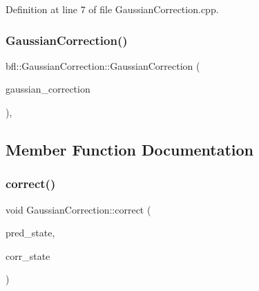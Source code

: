Definition at line 7 of file Gaussian\+Correction.\+cpp.

\mbox{\label{classbfl_1_1GaussianCorrection_af901442309ecdc64607ab256aabc78a7}} 
\subsubsection{\texorpdfstring{Gaussian\+Correction()}{GaussianCorrection()}\hspace{0.1cm}{\footnotesize\ttfamily [2/2]}}
{\footnotesize\ttfamily bfl\+::\+Gaussian\+Correction\+::\+Gaussian\+Correction (\begin{DoxyParamCaption}\item[{\mbox{\hyperlink{classbfl_1_1GaussianCorrection}{Gaussian\+Correction}} \&\&}]{gaussian\+\_\+correction }\end{DoxyParamCaption})\hspace{0.3cm}{\ttfamily [protected]}, {\ttfamily [noexcept]}}



\subsection{Member Function Documentation}
\mbox{\label{classbfl_1_1GaussianCorrection_a6308c8af37a1a451eba8e87e73952c84}} 
\subsubsection{\texorpdfstring{correct()}{correct()}}
{\footnotesize\ttfamily void Gaussian\+Correction\+::correct (\begin{DoxyParamCaption}\item[{const \mbox{\hyperlink{classbfl_1_1GaussianMixture}{Gaussian\+Mixture}} \&}]{pred\+\_\+state,  }\item[{\mbox{\hyperlink{classbfl_1_1GaussianMixture}{Gaussian\+Mixture}} \&}]{corr\+\_\+state }\end{DoxyParamCaption})}



